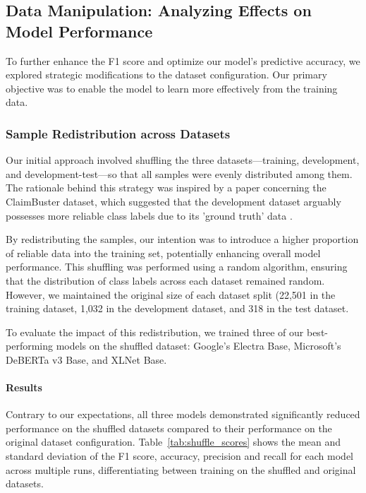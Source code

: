 \newpage
\subsection{Data Manipulation: Analyzing Effects on Model Performance}
To further enhance the F1 score and optimize our model's predictive accuracy, we explored strategic modifications to the dataset configuration. Our primary objective was to enable the model to learn more effectively from the training data.

\subsubsection{Sample Redistribution across Datasets}
Our initial approach involved shuffling the three datasets—training, development, and development-test—so that all samples were evenly distributed among them. The rationale behind this strategy was inspired by a paper concerning the ClaimBuster dataset, which suggested that the development dataset arguably possesses more reliable class labels due to its 'ground truth' data \cite{claimbuster_arslan}.

By redistributing the samples, our intention was to introduce a higher proportion of reliable data into the training set, potentially enhancing overall model performance. This shuffling was performed using a random algorithm, ensuring that the distribution of class labels across each dataset remained random. However, we maintained the original size of each dataset split (22,501 in the training dataset, 1,032 in the development dataset, and 318 in the test dataset.

To evaluate the impact of this redistribution, we trained three of our best-performing models on the shuffled dataset: Google’s Electra Base, Microsoft’s DeBERTa v3 Base, and XLNet Base.

\paragraph{Results}
Contrary to our expectations, all three models demonstrated significantly reduced performance on the shuffled datasets compared to their performance on the original dataset configuration. Table~\ref{tab:shuffle_scores} shows the mean and standard deviation of the F1 score, accuracy, precision and recall for each model across multiple runs, differentiating between training on the shuffled and original datasets. 

